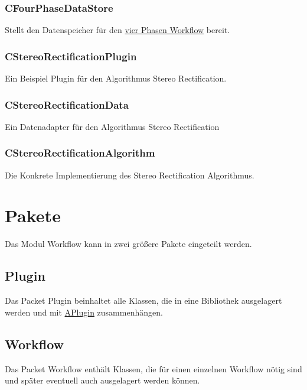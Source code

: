 \subsubsection{CFourPhaseDataStore}
Stellt den Datenspeicher für den \hyperref[Workflow:CFourPhaseWorkflow]{vier Phasen Workflow} bereit.
\subsubsection{CStereoRectificationPlugin}
Ein Beispiel Plugin für den Algorithmus Stereo Rectification.
\subsubsection{CStereoRectificationData}
Ein Datenadapter für den Algorithmus Stereo Rectification
\subsubsection{CStereoRectificationAlgorithm}
Die Konkrete Implementierung des Stereo Rectification Algorithmus.

\section{Pakete}
Das Modul Workflow kann in zwei größere Pakete eingeteilt werden.
\subsection{Plugin}
Das Packet Plugin beinhaltet alle Klassen, die in eine Bibliothek ausgelagert werden und mit \hyperref[Workflow:APlugin]{APlugin} zusammenhängen.
\subsection{Workflow}
Das Packet Workflow enthält Klassen, die für einen einzelnen Workflow nötig sind und später eventuell auch ausgelagert werden können.
